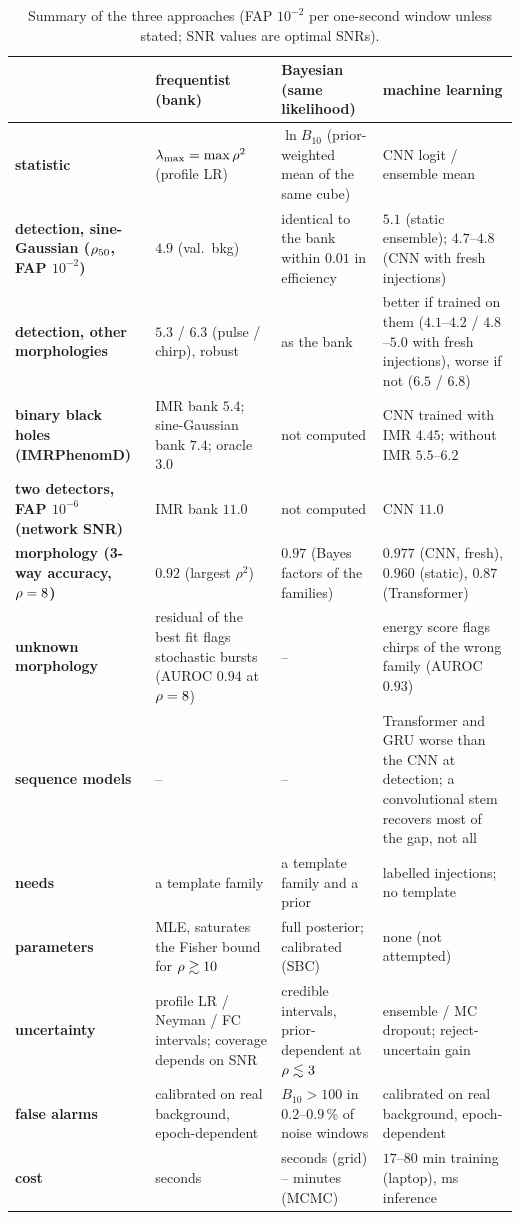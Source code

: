 \begin{table}[h]\centering\small
\begin{tabular}{p{3.0cm}p{3.7cm}p{3.7cm}p{3.9cm}}
\toprule
& frequentist (bank) & Bayesian (same likelihood) & machine learning\\
\midrule
\textbf{statistic} & $\lambda_{\max}=\max\rho^2$ (profile LR) & $\ln B_{10}$ (prior-weighted mean of the same cube) & CNN logit / ensemble mean\\
\textbf{detection, sine-Gaussian ($\rho_{50}$, FAP $10^{-2}$)} & $4.9$ (val.\ bkg) & identical to the bank within $0.01$ in efficiency & $5.1$ (static ensemble); $4.7$--$4.8$ (CNN with fresh injections)\\
\textbf{detection, other morphologies} & $5.3$ / $6.3$ (pulse / chirp), robust & as the bank & better if trained on them ($4.1$--$4.2$ / $4.8$--$5.0$ with fresh injections), worse if not ($6.5$ / $6.8$)\\
\textbf{binary black holes (IMRPhenomD)} & IMR bank $5.4$; sine-Gaussian bank $7.4$; oracle $3.0$ & not computed & CNN trained with IMR $4.45$; without IMR $5.5$--$6.2$\\
\textbf{two detectors, FAP $10^{-6}$ (network SNR)} & IMR bank $11.0$ & not computed & CNN $11.0$\\
\textbf{morphology (3-way accuracy, $\rho=8$)} & $0.92$ (largest $\rho^2$) & $0.97$ (Bayes factors of the families) & $0.977$ (CNN, fresh), $0.960$ (static), $0.87$ (Transformer)\\
\textbf{unknown morphology} & residual of the best fit flags stochastic bursts (AUROC $0.94$ at $\rho=8$) & -- & energy score flags chirps of the wrong family (AUROC $0.93$)\\
\textbf{sequence models} & -- & -- & Transformer and GRU worse than the CNN at detection; a convolutional stem recovers most of the gap, not all\\
\textbf{needs} & a template family & a template family and a prior & labelled injections; no template\\
\textbf{parameters} & MLE, saturates the Fisher bound for $\rho\gtrsim10$ & full posterior; calibrated (SBC) & none (not attempted)\\
\textbf{uncertainty} & profile LR / Neyman / FC intervals; coverage depends on SNR & credible intervals, prior-dependent at $\rho\lesssim3$ & ensemble / MC dropout; reject-uncertain gain\\
\textbf{false alarms} & calibrated on real background, epoch-dependent & $B_{10}>100$ in $0.2$--$0.9\,\%$ of noise windows & calibrated on real background, epoch-dependent\\
\textbf{cost} & seconds & seconds (grid) -- minutes (MCMC) & $17$--$80$ min training (laptop), ms inference\\
\bottomrule
\end{tabular}
\caption{Summary of the three approaches (FAP $10^{-2}$ per one-second window unless stated; SNR values are optimal SNRs).}\label{tab:final}
\end{table}


